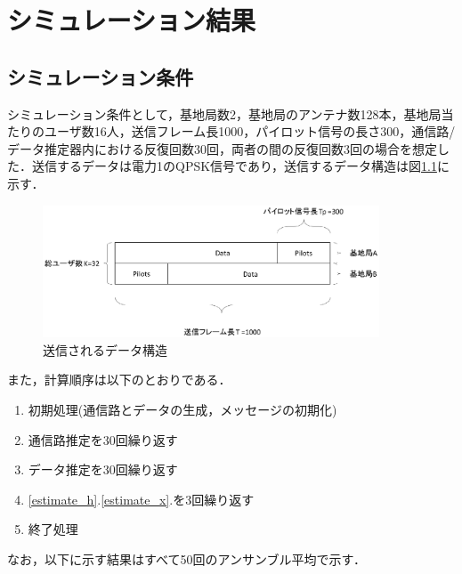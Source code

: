 \chapter{シミュレーション結果}
\section{シミュレーション条件}
\label{sec:contdition}
シミュレーション条件として，基地局数2，基地局のアンテナ数128本，基地局当たりのユーザ数16人，送信フレーム長1000，パイロット信号の長さ300，通信路/データ推定器内における反復回数30回，両者の間の反復回数3回の場合を想定した．送信するデータは電力1のQPSK信号であり，送信するデータ構造は図\ref{fig:data_structure}に示す．
\begin{figure}[htbp]
  \begin{center}
    \includegraphics[clip,width=10.0cm]{./data_structure.eps}
    \caption{送信されるデータ構造}
    \label{fig:data_structure}
  \end{center}
\end{figure}

また，計算順序は以下のとおりである．
\begin{enumerate}
	\item 初期処理(通信路とデータの生成，メッセージの初期化)
	\item 通信路推定を30回繰り返す \label{estimate_h}
	\item データ推定を30回繰り返す　　\label{estimate_x}
	\item \ref{estimate_h}.\ref{estimate_x}.を3回繰り返す
	\item 終了処理
\end{enumerate}
なお，以下に示す結果はすべて50回のアンサンブル平均で示す．
